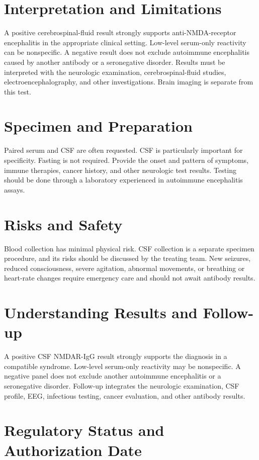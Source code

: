\section*{Interpretation and Limitations}
A positive cerebrospinal-fluid result strongly supports anti-NMDA-receptor encephalitis in the appropriate clinical setting. Low-level serum-only reactivity can be nonspecific. A negative result does not exclude autoimmune encephalitis caused by another antibody or a seronegative disorder. Results must be interpreted with the neurologic examination, cerebrospinal-fluid studies, electroencephalography, and other investigations. Brain imaging is separate from this test.
\section*{Specimen and Preparation}
Paired serum and CSF are often requested. CSF is particularly important for specificity. Fasting is not required. Provide the onset and pattern of symptoms, immune therapies, cancer history, and other neurologic test results. Testing should be done through a laboratory experienced in autoimmune encephalitis assays.

\section*{Risks and Safety}
Blood collection has minimal physical risk. CSF collection is a separate specimen procedure, and its risks should be discussed by the treating team. New seizures, reduced consciousness, severe agitation, abnormal movements, or breathing or heart-rate changes require emergency care and should not await antibody results.

\section*{Understanding Results and Follow-up}
A positive CSF NMDAR-IgG result strongly supports the diagnosis in a compatible syndrome. Low-level serum-only reactivity may be nonspecific. A negative panel does not exclude another autoimmune encephalitis or a seronegative disorder. Follow-up integrates the neurologic examination, CSF profile, EEG, infectious testing, cancer evaluation, and other antibody results.

\section*{Regulatory Status and Authorization Date}

\clearpage
